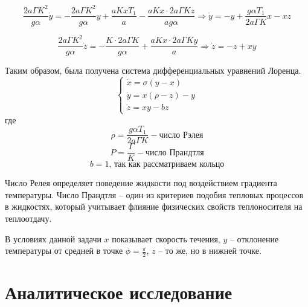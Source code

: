\documentclass[12pt]{article}
\begin{document}
\begin{equation*}
\frac{2a\Gamma K^2}{g\alpha} \dot{y} = -\frac{2a\Gamma K^2}{g\alpha}y + \frac{aKxT_1}{a} - \frac{aKx \cdot 2a \Gamma Kz}{ag\alpha} \Longrightarrow \dot{y} = -y + \frac{g\alpha T_1}{2a\Gamma K}x - xz
\end{equation*}

\begin{equation*}
\frac{2a\Gamma K^2}{g\alpha} \dot{z} = -\frac{K \cdot 2a\Gamma K}{g\alpha} + \frac{aKx \cdot 2a\Gamma Ky}{a} \Longrightarrow \dot{z} = -z+xy
\end{equation*}


Таким образом, была получена система дифференциальных уравнений Лоренца.
$$\begin{cases}	
	\dot{x} = \sigma (y-x) \\
	\dot{y} = x(\rho-z)-y \\
	\dot{z} = xy-bz
\end{cases}$$
где 
\[ \rho = \frac{g\alpha T_1}{2a\Gamma K} - \text{число Рэлея}\]
\[P = \frac{\Gamma}{K} - \text{число Прандтля}\] 
\[b = 1 \text{, так как рассматриваем кольцо}\]

Число Релея определяет поведение жидкости под воздействием градиента температуры. Число Прандтля -- один из критериев подобия тепловых процессов в жидкостях, который учитывает флияние физических свойств теплоносителя на теплоотдачу.

В условиях данной задачи $x$ показывает скорость течения, $y$ -- отклонение температуры от средней в точке $\phi = \frac{\pi}{2}$, $z$ -- то же, но в нижней точке.

\section{Аналитическое исследование}
\end{document}
